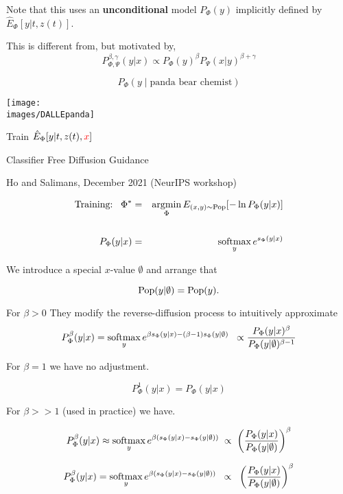 {\vfill
Note that this uses an {\bf unconditional} model $P_\Phi(y)$ implicitly defined by $\hat{E}_\Phi[y|t,z(t)]$.

\vfill
This is different from, but motivated by,
$$P^{\beta,\gamma}_{\Phi,\Psi}(y|x) \propto P_\Phi(y)^\beta P_\Psi(x|y)^{\beta + \gamma}$$


$$P_\Phi(y\;|\;\mbox{panda bear chemist})$$

\vfill
\centerline{\texttt{[image: \\images/DALLEpanda]}}

\vfill
\centerline {Train $\hat{E}_\Phi[y|t,z(t),{\color{red} x}]$}


\centerline{Classifier Free Diffusion Guidance}
\centerline{Ho and Salimans, December 2021 (NeurIPS workshop)}
\begin{eqnarray*}
\mbox{Training:}\;\;\;\Phi^* & = & \operatorname*{argmin}_\Phi E_{(x,y) \sim \mathrm{Pop}}[-\ln P_\Phi(y|x)] \\
\\
P_\Phi(y|x) & = & \operatorname*{softmax}_y e^{s_\Phi(y|x)}
\end{eqnarray*}

\vfill
We introduce a special $x$-value $\emptyset$ and arrange that

\vfill
{\color{red} $$\mathrm{Pop}(y|\emptyset) = \mathrm{Pop}(y).$$}


For $\beta > 0$ They modify the reverse-diffusion process to intuitively approximate
$$P^\beta_\Phi(y|x) = \operatorname*{softmax}_y e^{\beta s_\Phi(y|x) - (\beta-1)s_\Phi(y|\emptyset)} \;\;\propto
\frac{P_\Phi(y|x)^\beta}{P_\Phi(y|\emptyset)^{\beta-1}}$$

\vfill
For $\beta = 1$ we have no adjustment.

$$P^1_\Phi(y|x) = P_\Phi(y|x)$$

\vfill
For $\beta >> 1$ (used in practice) we have.

$$P^\beta_\Phi(y|x) \approx \operatorname*{softmax}_y e^{\beta(s_\Phi(y|x) - s_\Phi(y|\emptyset))} \;\propto\; \left(\frac{P_\Phi(y|x)}{P_\Phi(y|\emptyset)}\right)^\beta$$



$$P^\beta_\Phi(y|x) = \operatorname*{softmax}_y e^{\beta(s_\Phi(y|x) - s_\Phi(y|\emptyset))}\;\;\propto \;\;      \left(\frac{P_\Phi(y|x)}{P_\Phi(y|\emptyset)}\right)^\beta$$

\vfill

}
